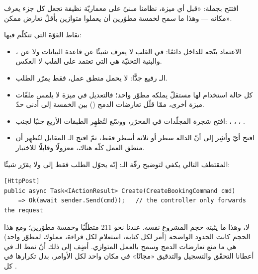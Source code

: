 افتتح بجملة: «قبل أي ميزة، نظامنا مبنيّ على معماريّة نظيفة تجعل كل جزء يعرف مكانه —
وهذا ما سمح لخمسة مطوّرين أن يعملوا متوازين بأقلّ تعارض ممكن».

نقاط القوّة التي تتكلّم فيها:
\begin{itemize}
\item الاعتماد يتّجه للداخل دائمًا:  في القلب لا يعرف شيئًا عن قاعدة
  البيانات ولا عن ، والبنية التحتيّة هي التي تعتمد على القلب لا العكس.
\item الـ رفيع جدًّا: لا يحمل منطق عمل، فقط يمرّر الطلب.
\item كل حالة استخدام لها  مستقلّ يملكه مطوّر واحد؛ فالتعديل في ميزة
  لا يلمس ملفّات ميزة أخرى، ممّا قلّل تعارضات الدمج () بين
  الخمسة إلى أدنى حدّ.
\end{itemize}

\begin{idea}
\begin{itemize}
\item افتح شجرة المجلّدات في المحرّر، ووسّع  لتُظهِر الطبقات
  الأربع جنبًا لجنب: ، ، ، .
\item افتح أيّ  وأشِر إلى أنّ الدالة سطر أو ثلاثة أسطر فقط، ثمّ افتح
  الـ المقابل لتُظهِر أن منطق العمل كلّه هناك، معزولًا وقابلًا للاختبار.
\end{itemize}
\end{idea}

المقتطف التالي يكفي لتوضيح رقّة الـ: إنّه يحوّل الطلب فقط إلى
 ولا يقرّر شيئًا:

\begin{english}
\begin{lstlisting}[language={[Sharp]C}]
[HttpPost]
public async Task<IActionResult> Create(CreateBookingCommand cmd)
    => Ok(await sender.Send(cmd));   // the controller only forwards the request
\end{lstlisting}
\end{english}

\begin{qa}
لا، وهذا ما يثبته حجم المشروع نفسه. عندنا نحو 211 متطلّبًا وخمسة مطوّرين؛ ومع هذا
الحجم كانت الحدود الواضحة (أمر لكل كتابة، استعلام لكل قراءة،  مملوك
لمطوّر واحد) هي ما منع تعارضات الدمج وسمح بالعمل المتوازي. أضِف إلى ذلك أنّ نمط
الـ في  أعطانا التحقّق والتسجيل والتدقيق «مجانًا» في مكان
واحد لكل الأوامر، بدل تكرارها في كل .
\end{qa}

